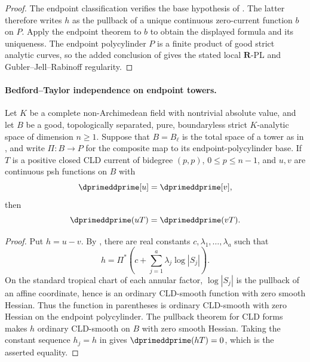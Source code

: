 \begin{proof}
The endpoint classification
 verifies the base
hypothesis of
.  The latter
therefore writes \(h\) as the pullback of a unique continuous
zero-current function \(b\) on \(P\).  Apply the endpoint theorem to
\(b\) to obtain the displayed formula and its uniqueness.
The endpoint polycylinder \(P\) is a finite product of good strict analytic
curves, so the added conclusion of
 gives the stated
local \(\mathbf R\)-PL and Gubler--Jell--Rabinoff regularity.
\end{proof}

\paragraph{Bedford--Taylor independence on endpoint towers.}
\begin{corollary}
\label{cor:p213-endpoint-tower-bt}
Let \(K\) be a complete non-Archimedean field with nontrivial absolute
value, and let \(B\) be a good, topologically separated, pure,
boundaryless strict \(K\)-analytic space of dimension \(n\geq1\).  Suppose
that \(B=B_\ell\) is the total space of a tower as in
, and write
\(\Pi:B\to P\) for the composite map to its endpoint-polycylinder base.
If \(T\) is a
positive closed CLD current of bidegree \((p,p)\),
\(0\leq p\leq n-1\), and \(u,v\) are continuous psh functions on \(B\)
with
\[
                         \dprimeddprime[u]=\dprimeddprime[v],
\]
then
\[
                 \dprimeddprime(uT)=\dprimeddprime(vT).
\]
\end{corollary}

\begin{proof}
Put \(h=u-v\).  By
, there are real
constants \(c,\lambda_1,\ldots,\lambda_a\) such that
\[
 h=\Pi^*
 \left(c+\sum_{j=1}^{a}\lambda_j\log|S_j|\right).
\]
On the standard tropical chart of each annular factor, \(\log|S_j|\) is
the pullback of an affine coordinate, hence is an ordinary CLD-smooth
function with zero smooth Hessian.  Thus the function in parentheses is
ordinary CLD-smooth with zero Hessian on the endpoint polycylinder.
The pullback theorem for CLD forms
 makes \(h\) ordinary CLD-smooth on \(B\)
with zero smooth Hessian.  Taking the constant sequence \(h_j=h\) in
 gives
\(\dprimeddprime(hT)=0\), which is the asserted equality.
\end{proof}

